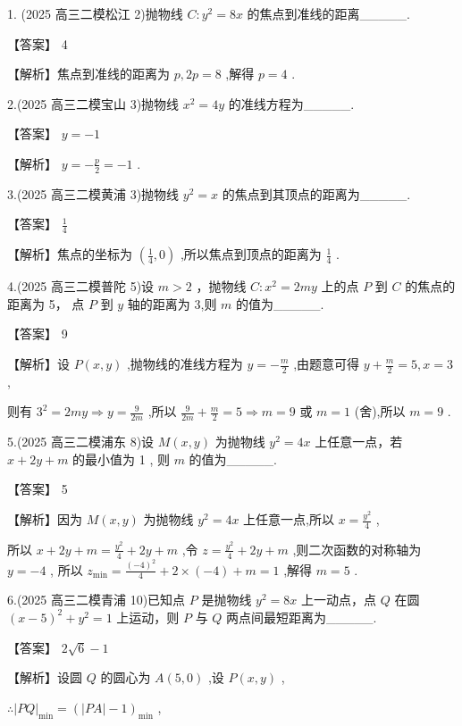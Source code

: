 \documentclass[10pt]{article}
\begin{document}
1. (2025 高三二模松江 2)抛物线 \(C : {y}^{2} = {8x}\) 的焦点到准线的距离\_\_\_\_\_.

【答案】 4

【解析】焦点到准线的距离为 \(p,{2p} = 8\) ,解得 \(p = 4\) .

2.(2025 高三二模宝山 3)抛物线 \({x}^{2} = {4y}\) 的准线方程为\_\_\_\_\_.

【答案】 \(y =  - 1\)

【解析】 \(y =  - \frac{p}{2} =  - 1\) .

3.(2025 高三二模黄浦 3)抛物线 \({y}^{2} = x\) 的焦点到其顶点的距离为\_\_\_\_\_.

【答案】 \(\frac{1}{4}\)

【解析】焦点的坐标为 \(\left( {\frac{1}{4},0}\right)\) ,所以焦点到顶点的距离为 \(\frac{1}{4}\) .

4.(2025 高三二模普陀 5)设 \(m > 2\) ，抛物线 \(C : {x}^{2} = {2my}\) 上的点 \(P\) 到 \(C\) 的焦点的距离为 5， 点 \(P\) 到 \(y\) 轴的距离为 3,则 \(m\) 的值为\_\_\_\_\_.

【答案】 9

【解析】设 \(P\left( {x,y}\right)\) ,抛物线的准线方程为 \(y =  - \frac{m}{2}\) ,由题意可得 \(y + \frac{m}{2} = 5,x = 3\) ,

则有 \({3}^{2} = {2my} \Rightarrow  y = \frac{9}{2m}\) ,所以 \(\frac{9}{2m} + \frac{m}{2} = 5 \Rightarrow  m = 9\) 或 \(m = 1\) (舍),所以 \(m = 9\) .

5.(2025 高三二模浦东 8)设 \(M\left( {x,y}\right)\) 为抛物线 \({y}^{2} = {4x}\) 上任意一点，若 \(x + {2y} + m\) 的最小值为 1 , 则 \(m\) 的值为\_\_\_\_\_.

【答案】 5

【解析】因为 \(M\left( {x,y}\right)\) 为抛物线 \({y}^{2} = {4x}\) 上任意一点,所以 \(x = \frac{{y}^{2}}{4}\) ,

所以 \(x + {2y} + m = \frac{{y}^{2}}{4} + {2y} + m\) ,令 \(z = \frac{{y}^{2}}{4} + {2y} + m\) ,则二次函数的对称轴为 \(y =  - 4\) , 所以 \({z}_{\min } = \frac{{\left( -4\right) }^{2}}{4} + 2 \times  \left( {-4}\right)  + m = 1\) ,解得 \(m = 5\) .

6.(2025 高三二模青浦 10)已知点 \(P\) 是抛物线 \({y}^{2} = {8x}\) 上一动点，点 \(Q\) 在圆 \({\left( x - 5\right) }^{2} + {y}^{2} = 1\) 上运动，则 \(P\) 与 \(Q\) 两点间最短距离为\_\_\_\_\_.

【答案】 \(2\sqrt{6} - 1\)

【解析】设圆 \(Q\) 的圆心为 \(A\left( {5,0}\right)\) ,设 \(P\left( {x,y}\right)\) ,

\(\therefore {\left| PQ\right| }_{\min } = {\left( \left| PA\right|  - 1\right) }_{\min }\) ,
\end{document}
